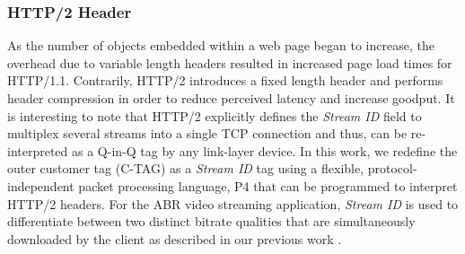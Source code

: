 \subsubsection{HTTP/2 Header}
\label{subsec:http2-header}

As the number of objects embedded within a web page began to increase, the overhead due to variable length headers resulted in increased page load times for HTTP/1.1. Contrarily, HTTP/2 introduces a fixed length header and performs header compression in order to reduce perceived latency and increase goodput. It is interesting to note that HTTP/2 explicitly defines the \textit{Stream ID} field to multiplex several streams into a single TCP connection and thus, can be re-interpreted as a Q-in-Q tag by any link-layer device. %
In this work, we redefine the outer customer tag (C-TAG) as a \textit{Stream ID} tag using a flexible, protocol-independent packet processing language, P4 that can be programmed to interpret HTTP/2 headers. For the ABR video streaming application, \textit{Stream ID} is used to differentiate between two distinct bitrate qualities that are simultaneously downloaded by the client as described in our previous work \cite{acm-mmhttp2}. 
